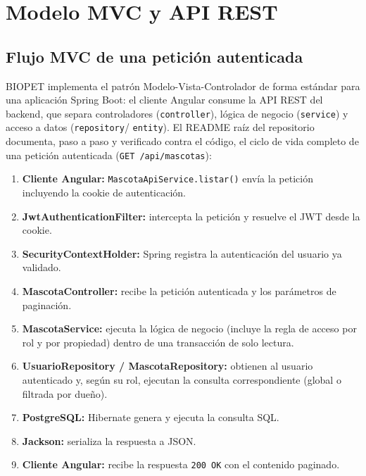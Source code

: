 \chapter{Modelo MVC y API REST}
\label{cap:mvc-api-rest}

\section{Flujo MVC de una petici\'on autenticada}
\label{sec:flujo-mvc}

BIOPET implementa el patr\'on Modelo-Vista-Controlador de forma est\'andar
para una aplicaci\'on Spring Boot: el cliente Angular consume la API REST
del backend, que separa controladores (\texttt{controller}), l\'ogica de
negocio (\texttt{service}) y acceso a datos (\texttt{repository}/
\texttt{entity}). El README ra\'iz del repositorio documenta, paso a paso
y verificado contra el c\'odigo, el ciclo de vida completo de una
petici\'on autenticada (\texttt{GET /api/mascotas}):

\begin{enumerate}[nosep]
  \item \textbf{Cliente Angular:} \texttt{MascotaApiService.listar()} env\'ia
    la petici\'on incluyendo la cookie de autenticaci\'on.
  \item \textbf{JwtAuthenticationFilter:} intercepta la petici\'on y
    resuelve el JWT desde la cookie.
  \item \textbf{SecurityContextHolder:} Spring registra la autenticaci\'on
    del usuario ya validado.
  \item \textbf{MascotaController:} recibe la petici\'on autenticada y los
    par\'ametros de paginaci\'on.
  \item \textbf{MascotaService:} ejecuta la l\'ogica de negocio (incluye la
    regla de acceso por rol y por propiedad) dentro de una transacci\'on de
    solo lectura.
  \item \textbf{UsuarioRepository / MascotaRepository:} obtienen al
    usuario autenticado y, seg\'un su rol, ejecutan la consulta
    correspondiente (global o filtrada por due\~no).
  \item \textbf{PostgreSQL:} Hibernate genera y ejecuta la consulta SQL.
  \item \textbf{Jackson:} serializa la respuesta a JSON.
  \item \textbf{Cliente Angular:} recibe la respuesta \texttt{200 OK} con
    el contenido paginado.
\end{enumerate}

